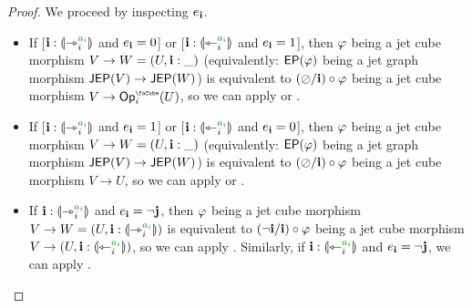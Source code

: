 \documentclass[a4paper]{memoir}
\begin{document}
\begin{proof}
	We proceed by inspecting $e_{\mathbf{i}}$.
	
	\begin{itemize}
		\item If [$\dm i : \rival{\jet_i\pmr{a_i}}$ and $e_{\mathbf{i}} = 0$] or [$\dm i : \rival{\tej_i\pmr{a_i}}$ and $e_{\mathbf{i}} = 1$], then $\varphi$ being a jet cube morphism $V \to W = (U, \mathbf{i} : \_)$ (equivalently: $\mathsf{EP}(\varphi)$ being a jet graph morphism $\mathsf{JEP}(V) \to \mathsf{JEP}(W)$) is equivalent to $(\oslash / \mathbf{i}) \circ \varphi$ being a jet cube morphism $V \to \Opcube_i(U)$, so we can apply  or .
		
		\item If [$\dm i : \rival{\jet_i\pmr{a_i}}$ and $e_{\mathbf{i}} = 1$] or [$\dm i : \rival{\tej_i\pmr{a_i}}$ and $e_{\mathbf{i}} = 0$], then $\varphi$ being a jet cube morphism $V \to W = (U, \mathbf{i} : \_)$ (equivalently: $\mathsf{EP}(\varphi)$ being a jet graph morphism $\mathsf{JEP}(V) \to \mathsf{JEP}(W)$) is equivalent to $(\oslash / \mathbf{i}) \circ \varphi$ being a jet cube morphism $V \to U$, so we can apply  or .
		
		\item If $\dm i : \rival{\jet_i\pmr{a_i}}$ and $e_{\mathbf{i}} = \lnot \mathbf{j}$, then $\varphi$ being a jet cube morphism $V \to W = (U, \dm i : \rival{\jet_i\pmr{a_i}})$ is equivalent to $(\lnot \mathbf{i} / \mathbf{i}) \circ \varphi$ being a jet cube morphism $V \to (U, \dm i : \rival{\tej_i\pmr{a_i}})$, so we can apply .
		Similarly, if $\dm i : \rival{\tej_i\pmr{a_i}}$ and $e_{\mathbf{i}} = \lnot \mathbf{j}$, we can apply .
		

\end{itemize}
\end{proof}
\end{document}
